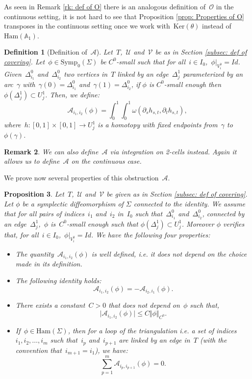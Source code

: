 \documentclass[10pt]{amsart}
\newtheorem{prop}{Proposition}[section]
\newtheorem{rk}[prop]{Remark}
\newtheorem{dfn}[prop]{Definition}
\newcommand{\Sympo}{\mathrm{Symp}_{0}}
\newcommand{\Ham}{\mathrm{Ham}}
\newcommand{\Ker}{\mathrm{Ker}}
\begin{document}
As seen in Remark \ref{rk: def of O} there is an analogous definition of~$\mathcal{O}$ in the continuous setting, it is not hard to see that Proposition \ref{prop: Properties of O} transposes in the continuous setting once we work with~$\Ker(\theta)$ instead of~$\Ham(\mathbb{A}_1)$.

\begin{dfn}[Definition of~$\mathcal{A}$]\label{def: def of A}
Let~$T$,~$\mathcal{U}$ and~$\mathcal{V}$ be as in Section \ref{subsec: def of covering}. Let~$\phi \in \Sympo(\Sigma)$ be $C^0$-small such that for all~$i\in I_0$,~$\phi\vert_{ V_i^{0}}=Id$. Given~$\Delta_{i_1}^0$ and~$\Delta_{i_2}^0$ two vertices in~$T$ linked by an edge~$\Delta_j^1$ parameterized by an arc~$\gamma$ with~$\gamma(0)=\Delta_{i_1}^0$ and~$\gamma(1)=\Delta_{i_2}^0$, if $\phi$ is $C^0$-small enough then $\phi(\Delta^1_j)\subset  U^1_j$. Then, we define:
$$\mathcal{A}_{i_1,i_2}(\phi)=\int_0^1\int_0^1 \omega(\partial_s h_{s,t},\partial_t h_{s,t}),$$
where~$h: [0,1]\times [0,1]\rightarrow U_j^1$ is a homotopy with fixed endpoints from~$\gamma$ to~$\phi(\gamma)$.
\end{dfn}

\begin{rk}\label{rk: def of A}
We can also define~$\mathcal{A}$ via integration on 2-cells instead. Again it allows us to define~$\mathcal{A}$ on the continuous case.
\end{rk}

We prove now several properties of this obstruction~$\mathcal{A}$.

\begin{prop}\label{prop: properties of A}
Let~$T$,~$\mathcal{U}$ and~$\mathcal{V}$ be given as in Section \ref{subsec: def of covering}. Let $\phi$ be a symplectic diffeomorphism of $\Sigma$ connected to the identity. We assume that for all pairs of indices~$i_1$ and~$i_2$ in~$I_0$ such that~$\Delta_{i_1}^0$ and~$\Delta_{i_2}^0$, connected by an edge~$\Delta_j^1$,~$\phi$ is~$C^0$-small enough such that $\phi(\Delta^1_j)\subset  U^1_j$. Moreover $\phi$ verifies that, for all~$i\in I_0$,~$\phi\vert_{ V_i^{0}}=Id$. We have the following four properties:
\begin{itemize}
    \item[(i)]The quantity~$\mathcal{A}_{i_1,i_2}(\phi)$ is well defined, i.e. it does not depend on the choice made in its definition.
    \item[(ii)] The following identity holds:~$$\mathcal{A}_{i_1,i_2}(\phi)=-\mathcal{A}_{i_2,i_1}(\phi).$$
    \item[(iii)] There exists a constant~$C>0$ that does not depend on~$\phi$ such that, 
   ~$$\vert \mathcal{A}_{i_1,i_2}(\phi)\vert\leq C \Vert \phi \Vert_{C^0}.$$
    \item[(iv)] If~$\phi\in \Ham(\Sigma)$, then for a loop of the triangulation i.e. a set of indices~$i_1, i_2, \ldots, i_m$ such that~$i_p$ and~$i_{p+1}$ are linked by an edge in~$T$ (with the convention that~$i_{m+1}=i_1$), we have: 
   ~$$\sum_{p=1}^m \mathcal{A}_{i_p,i_{p+1}}(\phi)=0.$$
\end{itemize}
\end{prop}
\end{document}
